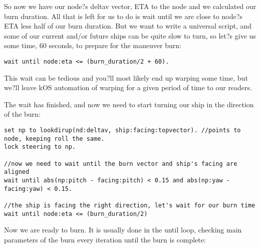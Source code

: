 So now we have our node?s deltav vector, ETA to the node and we calculated our burn duration. All that is left for us to do is wait until we are close to node?s ETA less half of our burn duration. But we want to write a universal script, and some of our current and/or future ships can be quite slow to turn, so let?s give us some time, 60 seconds, to prepare for the maneuver burn:

\begin{Verbatim}[frame=single]
wait until node:eta <= (burn_duration/2 + 60).
\end{Verbatim} 

This wait can be tedious and you?ll most likely end up warping some time, but we?ll leave kOS automation of warping for a given period of time to our readers.

The wait has finished, and now we need to start turning our ship in the direction of the burn:

\begin{Verbatim}[frame=single]
set np to lookdirup(nd:deltav, ship:facing:topvector). //points to node, keeping roll the same.
lock steering to np.

//now we need to wait until the burn vector and ship's facing are aligned
wait until abs(np:pitch - facing:pitch) < 0.15 and abs(np:yaw - facing:yaw) < 0.15.

//the ship is facing the right direction, let's wait for our burn time
wait until node:eta <= (burn_duration/2)
\end{Verbatim} 

Now we are ready to burn. It is usually done in the until loop, checking main parameters of the burn every iteration until the burn is complete:

